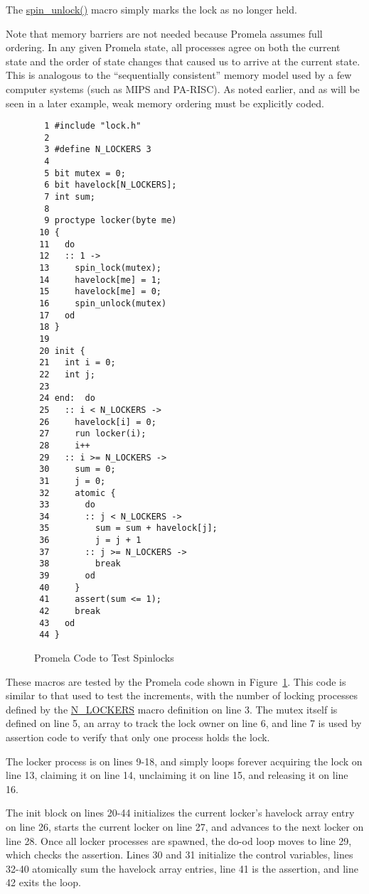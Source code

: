 The \url{spin_unlock()} macro simply marks the lock as no
longer held.

Note that memory barriers are not needed because Promela assumes
full ordering.
In any given Promela state, all processes agree on both the current
state and the order of state changes that caused us to arrive at
the current state.
This is analogous to the ``sequentially consistent'' memory model
used by a few computer systems (such as MIPS and PA-RISC).
As noted earlier, and as will be seen in a later example,
weak memory ordering must be explicitly coded.

\begin{figure}[htbp]
{ %
\begin{verbatim}
  1 #include "lock.h"
  2 
  3 #define N_LOCKERS 3
  4 
  5 bit mutex = 0;
  6 bit havelock[N_LOCKERS];
  7 int sum;
  8 
  9 proctype locker(byte me)
 10 {
 11   do
 12   :: 1 ->
 13     spin_lock(mutex);
 14     havelock[me] = 1;
 15     havelock[me] = 0;
 16     spin_unlock(mutex)
 17   od
 18 }
 19 
 20 init {
 21   int i = 0;
 22   int j;
 23 
 24 end:  do 
 25   :: i < N_LOCKERS ->
 26     havelock[i] = 0;
 27     run locker(i);
 28     i++
 29   :: i >= N_LOCKERS ->
 30     sum = 0;
 31     j = 0;
 32     atomic {
 33       do
 34       :: j < N_LOCKERS ->
 35         sum = sum + havelock[j];
 36         j = j + 1
 37       :: j >= N_LOCKERS ->
 38         break
 39       od
 40     }
 41     assert(sum <= 1);
 42     break
 43   od
 44 }
\end{verbatim}
}
\caption{Promela Code to Test Spinlocks}
\label{fig:analysis:Promela Code to Test Spinlocks}
\end{figure}

These macros are tested by the Promela code shown in
Figure~\ref{fig:analysis:Promela Code to Test Spinlocks}.
This code is similar to that used to test the increments,
with the number of locking processes defined by the \url{N_LOCKERS}
macro definition on line 3.
The mutex itself is defined on line 5, an array to track the lock owner
on line 6, and line 7 is used by assertion
code to verify that only one process holds the lock.

The locker process is on lines 9-18, and simply loops forever
acquiring the lock on line 13, claiming it on line 14,
unclaiming it on line 15, and releasing it on line 16.

The init block on lines 20-44 initializes the current locker's
havelock array entry on line 26, starts the current locker on
line 27, and advances to the next locker on line 28.
Once all locker processes are spawned, the do-od loop
moves to line 29, which checks the assertion.
Lines 30 and 31 initialize the control variables,
lines 32-40 atomically sum the havelock array entries,
line 41 is the assertion, and line 42 exits the loop.

